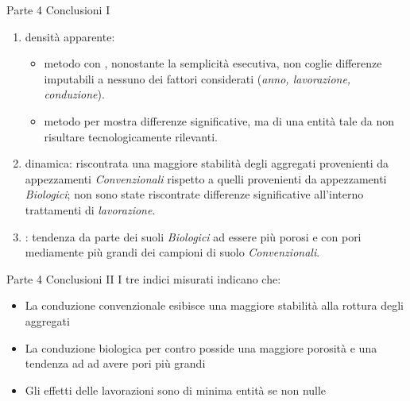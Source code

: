 \documentclass[xcolor={usenames, table, x11names}, final, 10pt]{beamer}
\begin{document}
\begin{frame}[label=finale]{Parte 4 \small{Conclusioni I}}
  \begin{enumerate}[<+->]

  \item densità apparente:
    \begin{itemize}
    \item metodo con \hyperlink{Core}{}, nonostante la semplicità esecutiva,
      non coglie differenze imputabili a nessuno dei fattori considerati
      (\emph{anno, lavorazione, conduzione}).
    \item metodo per \hyperlink{Clod}{} mostra differenze significative, ma di
      una entità tale da non risultare tecnologicamente rilevanti.
    \end{itemize}
  \item \hyperlink{distribuzione}{} dinamica: riscontrata una
    maggiore stabilità degli aggregati provenienti da appezzamenti
    \emph{Convenzionali} rispetto a quelli provenienti da appezzamenti
    \emph{Biologici}; non sono state riscontrate differenze significative
    all'interno trattamenti di \emph{lavorazione}.
  \item \hyperlink{Porosimetria}{}: tendenza da parte dei suoli
    \emph{Biologici} ad essere più porosi e con pori mediamente più
    grandi dei campioni di suolo \emph{Convenzionali}.
  \end{enumerate}

\end{frame}

\begin{frame}{Parte 4 \small{Conclusioni II}}
  I tre indici misurati indicano che:
  \begin{itemize}[<+->]
    \pause
  \item La conduzione convenzionale esibisce una maggiore stabilità
    alla rottura degli aggregati
  \item La conduzione biologica  per contro posside una maggiore
    porosità e una tendenza ad ad avere pori più grandi
  \item Gli effetti delle lavorazioni sono di minima entità se non nulle
  \end{itemize}

\end{frame}



\begin{frame}
\end{frame}
\end{document}
